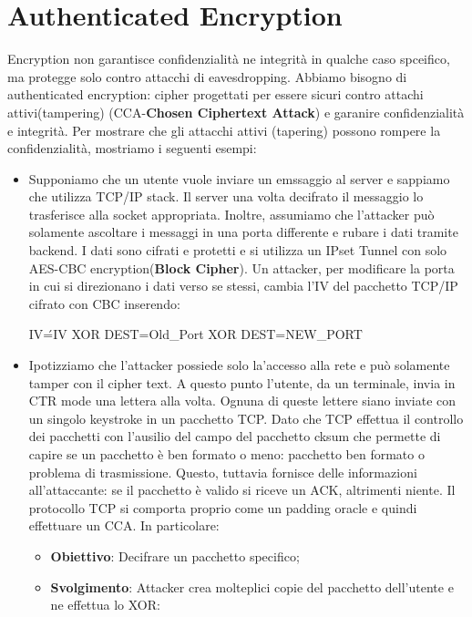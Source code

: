 \documentclass{article}
\theoremstyle{remark}
\begin{document}
\section{Authenticated Encryption}
Encryption non garantisce confidenzialità ne integrità in qualche caso spceifico, ma protegge solo contro attacchi di eavesdropping. Abbiamo bisogno di authenticated encryption: cipher progettati per essere sicuri contro attachi attivi(tampering) (CCA-\textbf{Chosen Ciphertext Attack}) e garanire confidenzialità e integrità.
Per mostrare che gli attacchi attivi (tapering) possono rompere la confidenzialità, mostriamo i seguenti esempi:
\begin{itemize}
	\item Supponiamo che un utente vuole inviare un emssaggio al server e sappiamo che utilizza TCP/IP stack. Il server una volta decifrato il messaggio lo trasferisce alla socket appropriata. Inoltre, assumiamo che l'attacker può solamente ascoltare i messaggi in una porta differente e rubare i dati tramite backend. I dati sono cifrati e protetti e si utilizza un IPset Tunnel con solo AES-CBC encryption(\textbf{Block Cipher}).
	      Un attacker, per modificare la porta in cui si direzionano i dati verso se stessi, cambia l'IV del pacchetto TCP/IP cifrato con CBC inserendo:
	      \begin{center}
		      IV\'=IV XOR DEST=Old\_Port XOR DEST=NEW\_PORT
	      \end{center}
	\item Ipotizziamo che l'attacker possiede solo la'accesso alla rete e può solamente tamper con il cipher text. A questo punto l'utente, da un terminale, invia in CTR mode una lettera alla volta. Ognuna di queste lettere siano inviate con un singolo keystroke in un pacchetto TCP. Dato che TCP effettua il controllo dei pacchetti con l'ausilio del campo del pacchetto cksum che permette di capire se un pacchetto è ben formato o meno: pacchetto ben formato o problema di trasmissione.
	      Questo, tuttavia fornisce delle informazioni all'attaccante: se il pacchetto è valido si riceve un ACK, altrimenti niente. Il protocollo TCP si comporta proprio come un padding oracle e quindi effettuare un CCA.
	      In particolare:
	      \begin{itemize}
		      \item \textbf{Obiettivo}: Decifrare un pacchetto specifico;
		      \item \textbf{Svolgimento}: Attacker crea molteplici copie del pacchetto dell'utente e ne effettua lo XOR:
		            \begin{center}

\end{center}
\end{itemize}
\end{itemize}
\end{document}
